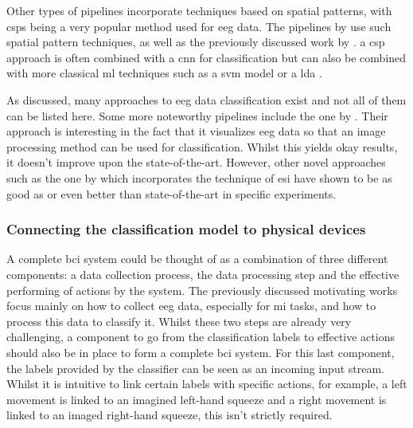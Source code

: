 Other types of pipelines incorporate techniques based on spatial patterns, with \glspl{csp} being a very popular method used for \gls{eeg} data.
The pipelines by \citet{eeg_mi_model_lda_csp, eeg_mi_model_deep_cnn_spatial_filters} use such spatial pattern techniques, as well as the previously discussed work by \citet{cheap_bci_feasibility}.
a \gls{csp} approach is often combined with a \gls{cnn} for classification but can also be combined with more classical \gls{ml} techniques such as a \gls{svm} model or a \gls{lda} \citep{eeg_mi_model_lda_csp}.

As discussed, many approaches to \gls{eeg} data classification exist and not all of them can be listed here.
Some more noteworthy pipelines include the one by \citet{eeg_mi_model_image_based}.
Their approach is interesting in the fact that it visualizes \gls{eeg} data so that an image processing method can be used for classification.
Whilst this yields okay results, it doesn't improve upon the state-of-the-art.
However, other novel approaches such as the one by \citet{eeg_model_esi} which incorporates the technique of \gls{esi} have shown to be as good as or even better than state-of-the-art in specific experiments.




\subsubsection{Connecting the classification model to physical devices}
\label{subsubsec:bci_opportunities_obstacles_motivating_examples_physical_devices}

A complete \gls{bci} system could be thought of as a combination of three different components: a data collection process, the data processing step and the effective performing of actions by the system.
The previously discussed motivating works focus mainly on how to collect \gls{eeg} data, especially for \gls{mi} tasks, and how to process this data to classify it.
Whilst these two steps are already very challenging, a component to go from the classification labels to effective actions should also be in place to form a complete \gls{bci} system.
For this last component, the labels provided by the classifier can be seen as an incoming input stream.
Whilst it is intuitive to link certain labels with specific actions, for example, a left movement is linked to an imagined left-hand squeeze and a right movement is linked to an imaged right-hand squeeze, this isn't strictly required.

